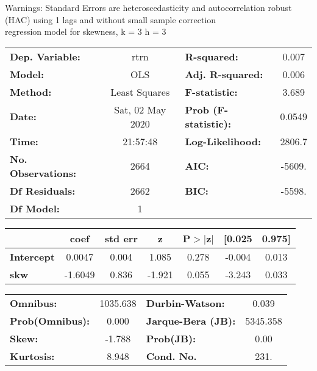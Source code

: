 Warnings: \newline
 [1] Standard Errors are heteroscedasticity and autocorrelation robust (HAC) using 1 lags and without small sample correction\\ 

regression model for skewness, k = 3 h = 3\begin{center}
\begin{tabular}{lclc}
\toprule
\textbf{Dep. Variable:}    &       rtrn       & \textbf{  R-squared:         } &     0.007   \\
\textbf{Model:}            &       OLS        & \textbf{  Adj. R-squared:    } &     0.006   \\
\textbf{Method:}           &  Least Squares   & \textbf{  F-statistic:       } &     3.689   \\
\textbf{Date:}             & Sat, 02 May 2020 & \textbf{  Prob (F-statistic):} &   0.0549    \\
\textbf{Time:}             &     21:57:48     & \textbf{  Log-Likelihood:    } &    2806.7   \\
\textbf{No. Observations:} &        2664      & \textbf{  AIC:               } &    -5609.   \\
\textbf{Df Residuals:}     &        2662      & \textbf{  BIC:               } &    -5598.   \\
\textbf{Df Model:}         &           1      & \textbf{                     } &             \\
\bottomrule
\end{tabular}
\begin{tabular}{lcccccc}
                   & \textbf{coef} & \textbf{std err} & \textbf{z} & \textbf{P$> |$z$|$} & \textbf{[0.025} & \textbf{0.975]}  \\
\midrule
\textbf{Intercept} &       0.0047  &        0.004     &     1.085  &         0.278        &       -0.004    &        0.013     \\
\textbf{skw}       &      -1.6049  &        0.836     &    -1.921  &         0.055        &       -3.243    &        0.033     \\
\bottomrule
\end{tabular}
\begin{tabular}{lclc}
\textbf{Omnibus:}       & 1035.638 & \textbf{  Durbin-Watson:     } &    0.039  \\
\textbf{Prob(Omnibus):} &   0.000  & \textbf{  Jarque-Bera (JB):  } & 5345.358  \\
\textbf{Skew:}          &  -1.788  & \textbf{  Prob(JB):          } &     0.00  \\
\textbf{Kurtosis:}      &   8.948  & \textbf{  Cond. No.          } &     231.  \\
\bottomrule
\end{tabular}
\end{center}

